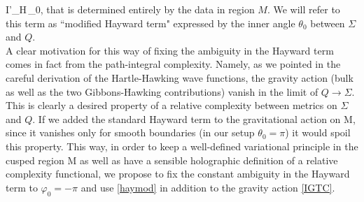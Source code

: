 \documentclass[a4paper,12pt]{article}
\begin{document}
\be
I'_H\equiv{}\int \sqrt{\gamma}\,\theta_0,  \label{haymod}
\ee
that is determined entirely by the data in region $M$. We will refer to this term as ``modified Hayward term" expressed by the inner angle $\theta_0$ between $\Sigma$ and $Q$.\\
A clear motivation for this way of fixing the ambiguity in the Hayward term comes in fact from the path-integral complexity. Namely, as we pointed in the careful derivation of the Hartle-Hawking wave functions, the gravity action (bulk as well as the two Gibbons-Hawking contributions) vanish in the limit of $Q\to \Sigma$. This is clearly a desired property of a relative complexity between metrics on $\Sigma$ and $Q$. If we added the standard Hayward term to the gravitational action on M, since it vanishes only for smooth boundaries (in our setup $\theta_0=\pi$) it would spoil this property. This way, in order to keep a well-defined variational principle in the cusped region M as well as have a sensible holographic definition of a relative complexity functional, we propose to fix the constant ambiguity in the Hayward term to $\varphi_0=-\pi$ and use \eqref{haymod} in addition to the gravity action \eqref{IGTC}.
\end{document}
